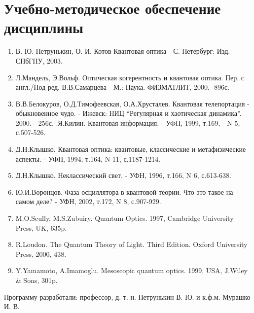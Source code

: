 \section{Учебно-методическое обеспечение дисциплины}
\begin{enumerate}
\item В. Ю. Петрунькин, О. И. Котов Квантовая оптика -
  С. Петербург: Изд. СПбГПУ, 2003.  
\item Л.Мандель, Э.Вольф. Оптическая когерентность и
  квантовая оптика. Пер. с англ./Под ред. В.В.Самарцева - М.:
  Наука. ФИЗМАТЛИТ, 2000.- 896с. 
\item В.В.Белокуров, О.Д.Тимофеевская,
  О.А.Хрусталев. Квантовая телепортация - обыкновенное чудо. - Ижевск:
  НИЦ ``Регулярная и хаотическая динамика''. 2000. - 256с. 
.Я.Килин. Квантовая информация. - УФН, 1999, т.169,
  - N 5, с.507-526. 
\item Д.Н.Клышко. Квантовая оптика: квантовые,
  классические и метафизические аспекты. - УФН, 1994, т.164, N 11,
  с.1187-1214. 
\item Д.Н.Клышко. Неклассический свет. - УФН, 1996,
  т.166, N 6, с.613-638. 
\item Ю.И.Воронцов. Фаза осциллятора в квантовой
  теории. Что это такое на самом деле? - УФН, 2002, т.172, N 8,
  с.907-929. 
\item M.O.Scully, M.S.Zubuiry. Quantum Optics. 1997,
  Cambridge University Press, UK, 635p. 
\item R.Loudon. The Quantum Theory of Light. Third
  Edition. Oxford University Press, 2000, 438. 
\item Y.Yamamoto, A.Imamoglu.  Mesoscopic quantum
  optics. 1999, USA, J.Wiley \& Sons, 301p. 
\end{enumerate}

Программу разработали: профессор, д. т. н. Петрунькин В. Ю. и
к.ф.м. Мурашко И. В.


